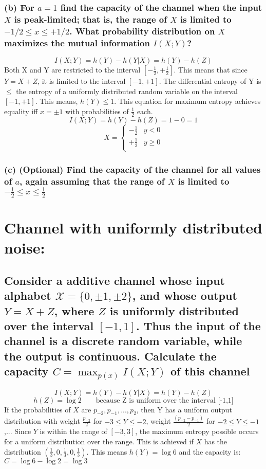 \documentclass[11pt, oneside]{book}   	%
\begin{document}
\subsubsection{(b) For $a=1$ find the capacity of the channel when the input $X$ is peak-limited; that is, the range of $X$ is limited to $-1/2 \leq x \leq +1/2$.  What probability distribution on $X$ maximizes the mutual information $I(X;Y)$?}

$$I(X;Y) = h(Y) - h(Y|X) = h(Y) - h(Z)$$
Both X and Y are restricted to the interval $[-\frac{1}{2}, +\frac{1}{2}]$.  This means that since $Y = X + Z$, it is limited to the interval $[-1, +1]$.  The differential entropy of Y is $\leq$ the entropy of a uniformly distributed random variable on the interval $[-1, +1]$.  This means, $h(Y) \leq 1$.  This equation for maximum entropy achieves equality iff $x = \pm 1$ with probabilities of $\frac{1}{2}$ each.
$$I(X;Y) = h(Y) - h(Z) = 1 - 0 = 1$$
\[ \hat{X} =
  \begin{cases} 
	-\frac{1}{2} & y < 0 \\
	+\frac{1}{2} & y \geq 0 \\
   \end{cases}
\]

\subsubsection{(c) (Optional) Find the capacity of the channel for all values of $a$, again assuming that the range of $X$ is limited to $-\frac{1}{2} \leq x \leq \frac{1}{2} $}

\section{Channel with uniformly distributed noise:}
\subsection*{Consider a additive channel whose input alphabet $\mathcal{X}=\{0, \pm1, \pm2\}$, and whose output $Y=X+Z$, where $Z$ is uniformly distributed over the interval $[-1,1]$.  Thus the input of the channel is a discrete random variable, while the output is continuous.  Calculate the capacity $C=\max_{p(x)}I(X;Y)$ of this channel}
$$I(X;Y)=h(Y)-h(Y|X)=h(Y)-h(Z)$$
$$h(Z)=\log{2} \qquad \text{because Z is uniform over the interval [-1,1]}$$
If the probabilities of $X$ are $p_{-2},p_{-1},...,p_2$, then Y has a uniform output distribution with weight $\frac{p_{-2}}{2}$ for $-3 \leq Y \leq -2$, weight $\frac{(p_{-2}-p_{-1})}{2}$ for $-2 \leq Y \leq -1$,...  Since $Y$ is within the range of $[-3,3]$, the maximum entropy possible occurs for a uniform distribution over the range.  This is achieved if $X$ has the distribution $(\frac{1}{3}, 0, \frac{1}{3}, 0, \frac{1}{3})$.  This means $h(Y)=\log{6}$ and the capacity is: $C=\log{6}-\log{2}=\log{3}$
\end{document}
